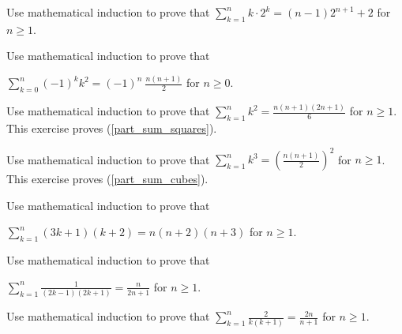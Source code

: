 \begin{exer}[\exerU] %
\label{exer_math_ind_sum_multpowers2}
    Use mathematical induction to prove that $\displaystyle \sum_{k=1}^nk \cdot 2^k = (n-1)2^{n+1}+2$ for $n \ge  1$.   
\end{exer}

\begin{exer}[\exerU] %
\label{exer_math_ind_sum_alt_sq}
    Use mathematical induction to prove that 
    
    $\displaystyle  \sum_{k=0}^n(-1)^kk^2 = (-1)^n ~ \frac{n(n+1)}{2}$
    for $n\ge 0$. 
\end{exer}

\begin{exer}[\exerU] %
\label{exer_math_ind_sum_squares}
    Use mathematical induction to prove that $\displaystyle \sum_{k=1}^nk^2=\frac{n(n+1)(2n+1)}{6}$ for $n\ge 1$.  This exercise proves  (\ref{part_sum_squares}).
\end{exer}

\begin{exer}[\exerU] %
\label{exer_math_ind_sum_squares}
    Use mathematical induction to prove that $\displaystyle \sum_{k=1}^nk^3=\left(\frac{n(n+1)}{2}\right)^2$ for $n\ge 1$. This exercise proves  (\ref{part_sum_cubes}).
\end{exer}

\begin{exer}[\exerU] %
\label{exer_math_ind_sum_poly}
    Use mathematical induction to prove that 
    
    $\displaystyle \sum_{k=1}^n(3k+1)(k+2) = n(n+2)(n+3)$ for $n\ge 1$. 
\end{exer}

\begin{exer}[\exerU] %
\label{exer_math_ind_sum_frac}
    Use mathematical induction to prove that 
    
    $\displaystyle \sum_{k=1}^n\frac{1}{(2k-1)(2k+1)}=\frac{n}{2n+1}$ for $n\ge 1$.    
\end{exer}

\begin{exer}[\exerU] %
\label{exer_math_ind_sum_hs_recip}
    Use mathematical induction to prove that     
    $\displaystyle \sum_{k=1}^n\frac{2}{k(k+1)}=\frac{2n}{n+1}$ for $n\ge 1$.    
\end{exer}

